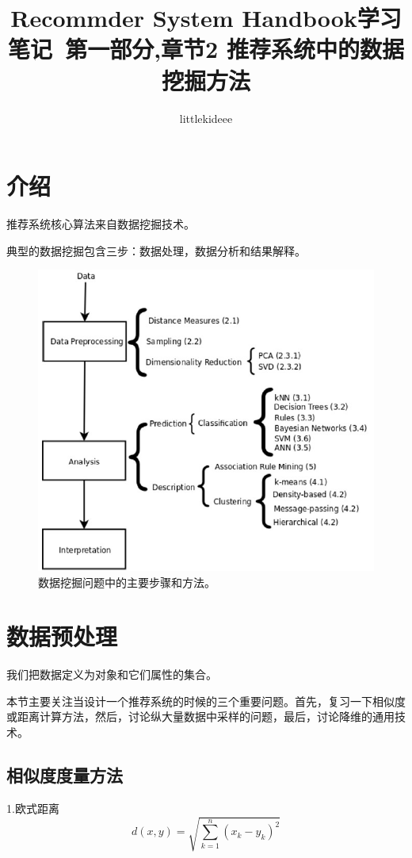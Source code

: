 \documentclass{article}
\begin{document}
 \title{Recommder System Handbook学习笔记\ 第一部分,章节2 推荐系统中的数据挖掘方法}
 \author{littlekideee}
 \maketitle
 \section{介绍}
 推荐系统核心算法来自数据挖掘技术。

 典型的数据挖掘包含三步：数据处理，数据分析和结果解释。
 \begin{figure}[htb]
	  \begin{center}
	  	\includegraphics[scale=0.6]{f2.1.jpg}
	  	\caption{数据挖掘问题中的主要步骤和方法。}
	  \end{center}
 \end{figure}

 \section{数据预处理}
 我们把数据定义为对象和它们属性的集合。

 本节主要关注当设计一个推荐系统的时候的三个重要问题。首先，复习一下相似度或距离计算方法，然后，讨论纵大量数据中采样的问题，最后，讨论降维的通用技术。

 \subsection{相似度度量方法}
 1.欧式距离
 $$ d(x,y)=\sqrt{\mathop{\sum}_{k=1}^n(x_k-y_k)^2} $$
\end{document}
